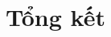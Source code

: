 \documentclass[12pt]{extreport}
\begin{document}
\section{}
\subsection{}

\subsection{}

\subsection{}
\subsection{}

\subsection{}

\chapter{Tổng kết}


\newpage
\begin{thebibliography}{12}
   
\end{thebibliography}
\end{document}
